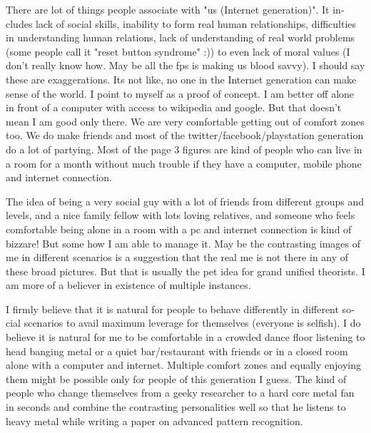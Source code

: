 \begin{english}
There are lot of things people associate with "us (Internet generation)". It includes lack of social skills, inability to 
form real human relationships, difficulties in understanding human relations, lack of understanding of real world 
problems (some people call it "reset button syndrome" :)) to even lack of moral values (I don't really know how. 
May be all the fps is making us blood savvy). I should say these are exaggerations. Its not like, no one in the 
Internet generation can make sense of the world. I point to myself as a proof of concept. I am better off alone in 
front of a computer with access to wikipedia and google. But that doesn't mean I am good only there. We are very 
comfortable getting out of comfort zones too. We do make friends and most of the twitter/facebook/playstation 
generation do a lot of partying. Most of the page 3 figures are kind of people who can live in a room for a month 
without much trouble if they have a computer, mobile phone and internet connection. 

The idea of being a very social guy with a lot of friends from different groups and levels, and a nice family fellow 
with lots loving relatives, and someone who feels comfortable being alone in a room with a pc and internet 
connection is kind of bizzare! But some how I am able to manage it. May be the contrasting images of me in 
different scenarios is a suggestion that the real me is not there in any of these broad pictures. But that is usually 
the pet idea for grand unified theorists. I am more of a believer in existence of multiple instances. 

I firmly believe that it is natural for people to behave differently in different social scenarios to avail maximum 
leverage for themselves (everyone is selfish). I do believe it is natural for me to be comfortable in a crowded 
dance floor listening to head banging metal or a quiet bar/restaurant with friends or in a closed room alone with 
a computer and internet. Multiple comfort zones and equally enjoying them might be possible only for people of 
this generation I guess. The kind of people who change themselves from a geeky researcher to a hard core 
metal fan in seconds and combine the contrasting personalities well so that he listens to heavy metal while 
writing a paper on advanced pattern recognition. 


\end{english}
